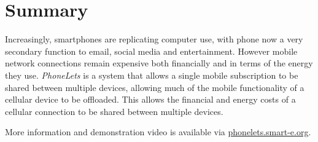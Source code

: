 \documentclass{sig-alternate-2013}
\begin{document}
\section{Summary}

Increasingly, smartphones are replicating computer use, with phone now a very secondary function to email, social media and entertainment. However mobile network connections remain expensive both financially and in terms of the energy they use. \emph{PhoneLets} is a system that allows a single mobile subscription to be shared between multiple devices, allowing much of the mobile functionality of a cellular device to be offloaded. This allows the financial and energy costs of a cellular connection to be shared between multiple devices.

More information and demonstration video is available via \url{phonelets.smart-e.org}.

{ 


}

%
\end{document}
